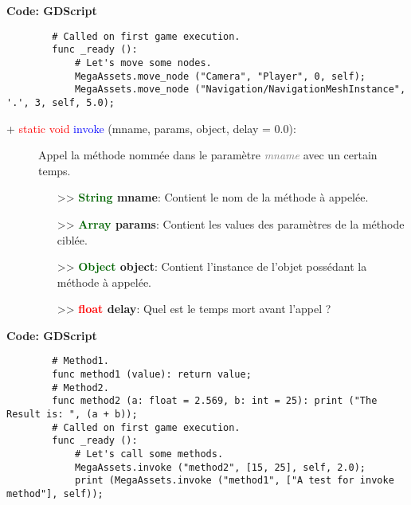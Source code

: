 \documentclass[a4paper, 11pt]{article}
\begin{document}
	\textbf{Code: GDScript}
	\begin{lstlisting}
		# Called on first game execution.
		func _ready ():
			# Let's move some nodes.
			MegaAssets.move_node ("Camera", "Player", 0, self);
			MegaAssets.move_node ("Navigation/NavigationMeshInstance", '.', 3, self, 5.0);
	\end{lstlisting}
	\begin{description}
		\item [+ \textcolor{red}{static void} \textcolor{blue}{invoke} (mname, params, object, delay = 
		0.0):] Appel la méthode nommée dans le paramètre \textit{\textcolor{gray}{mname}} avec un certain 
		temps.
		\begin{itemize}
			\item [>> \textbf{\textcolor{darkgreen}{String} mname}:] Contient le nom de la méthode à 
			appelée.
			\item [>> \textbf{\textcolor{darkgreen}{Array} params}:] Contient les values des paramètres de 
			la méthode ciblée.
			\item [>> \textbf{\textcolor{darkgreen}{Object} object}:] Contient l'instance de l'objet 
			possédant la méthode à appelée.
			\item [>> \textbf{\textcolor{red}{float} delay}:] Quel est le temps mort avant l'appel ?\\
		\end{itemize}
	\end{description}
	\textbf{Code: GDScript}
	\begin{lstlisting}
		# Method1.
		func method1 (value): return value;
		# Method2.
		func method2 (a: float = 2.569, b: int = 25): print ("The Result is: ", (a + b));
		# Called on first game execution.
		func _ready ():
			# Let's call some methods.
			MegaAssets.invoke ("method2", [15, 25], self, 2.0);
			print (MegaAssets.invoke ("method1", ["A test for invoke method"], self));
	\end{lstlisting}
\end{document}
